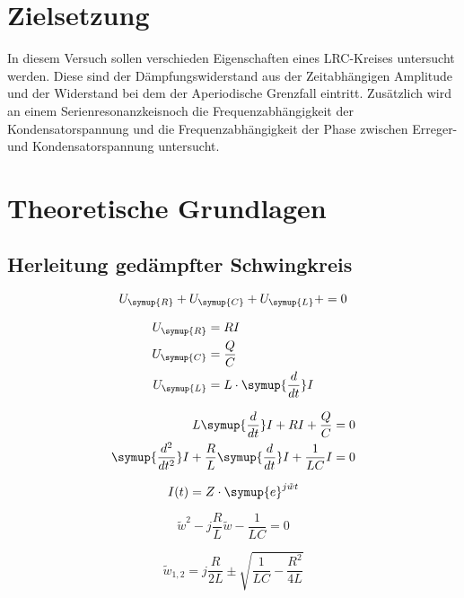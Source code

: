 \section{Zielsetzung}
    In diesem Versuch sollen verschieden Eigenschaften eines LRC-Kreises untersucht werden. Diese sind der Dämpfungswiderstand aus der 
    Zeitabhängigen Amplitude und der Widerstand bei dem der Aperiodische Grenzfall eintritt. Zusätzlich wird an einem 
    Serienresonanzkeisnoch die Frequenzabhängigkeit der Kondensatorspannung und die Frequenzabhängigkeit der Phase zwischen Erreger- und 
    Kondensatorspannung untersucht.

\section{Theoretische Grundlagen}

    \subsection{Herleitung gedämpfter Schwingkreis}

    \begin{equation}
    U_{\symup{R}} + U_{\symup{C}} + U_{\symup{L}} +  = 0     
    \end{equation}

    \begin{align}
        U_{\symup{R}} & = RI \\
        U_{\symup{C}} & = \frac{Q}{C}\\
        U_{\symup{L}} & = L \cdot \symup{\frac{d}{dt}}I
    \end{align}

    \begin{align}
        L  \symup{\frac{d}{dt}}I + RI + \frac{Q}{C} & = 0\\
        \symup{\frac{d^2}{dt^2}}I + \frac{R}{L} \symup{\frac{d}{dt}}I + \frac{1}{LC}I & = 0
    \end{align}
    
    \begin{equation}
        I(t) = Z \cdot \symup{e}^{j \tilde{w} t}
    \end{equation}

    \begin{equation}
        \tilde{w}^2 - j \frac{R}{L}\tilde{w} - \frac{1}{LC} = 0
    \end{equation}

    \begin{equation}
        \tilde{w}_{1,2} = j \frac{R}{2L} \pm \sqrt{\frac{1}{LC}-\frac{R^2}{4L}}
    \end{equation}
    
